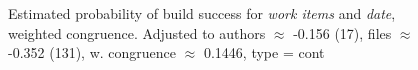 \begin{figure}[t]
\centering
  \caption{Estimated probability of build success for \emph{work items} and \emph{date}, weighted congruence. Adjusted to authors $\approx$ -0.156 (17), files $\approx$ -0.352 (131), w. congruence $\approx$ 0.1446, type = cont}
  \label{fig:weighted_congruence_workitems_age}
\end{figure}


